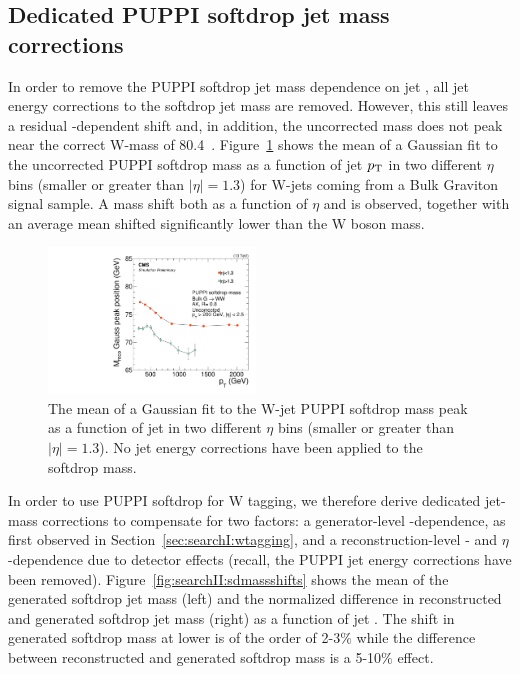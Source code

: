 \subsection{Dedicated PUPPI softdrop jet mass corrections}
\label{sec:searchII:masscorr}
In order to remove the PUPPI softdrop jet mass dependence on jet \PT, all jet energy corrections to the softdrop jet mass are removed. However, this still leaves a residual \PT-dependent shift and, in addition, the uncorrected mass does not peak near the correct W-mass of 80.4~\GeV. Figure~\ref{fig:searchII:UncorrSD} shows the mean of a Gaussian fit to the uncorrected PUPPI softdrop mass as a function of jet $p_{\mathrm{T}}$ in two different $\eta$ bins (smaller or greater than $|\eta|=1.3$) for W-jets coming from a Bulk Graviton signal sample. A mass shift both as a function of $\eta$ and \PT is observed, together with an average mean shifted significantly lower than the W boson mass.
\begin{figure}[h!]
\centering
\includegraphics[width=0.49\textwidth]{figures/analysis/search2/AN-16-235/plots/RecoPuppiSoftdropMass_vspt.pdf}
\caption{The mean of a Gaussian fit to the W-jet PUPPI softdrop mass peak as a function of jet \PT in two different $\eta$ bins (smaller or greater than $|\eta|=1.3$). No jet energy corrections have been applied to the softdrop mass.}
\label{fig:searchII:UncorrSD}
\end{figure}
In order to use PUPPI softdrop for W tagging, we therefore derive dedicated jet-mass corrections to compensate for two factors: a generator-level \PT-dependence, as first observed in Section~\ref{sec:searchI:wtagging}, and a reconstruction-level \PT- and $\eta$-dependence due to detector effects (recall, the PUPPI jet energy corrections have been removed). Figure~\ref{fig:searchII:sdmassshifts} shows the mean of the generated softdrop jet mass (left) and the normalized difference in reconstructed and generated softdrop jet mass (right) as a function of jet \PT. The shift in generated softdrop mass at lower \PT is of the order of 2-3$\%$ while the difference between reconstructed and generated softdrop mass is a 5-10$\%$ effect.
